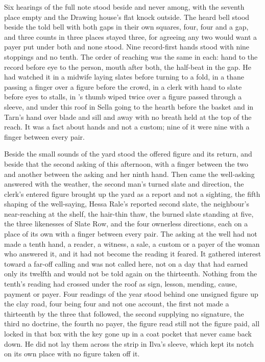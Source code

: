 Six hearings of the full note stood beside and never among, with the seventh place empty and the Drawing house's flat knock outside. The heard bell stood beside the told bell with both gaps in their own squares, four, four and a gap, and three counts in three places stayed three, for agreeing any two would want a payer put under both and none stood. Nine record-first hands stood with nine stoppings and no tenth. The order of reaching was the same in each: hand to the record before eye to the person, mouth after both, the half-beat in the gap. He had watched it in a midwife laying slates before turning to a fold, in a thane passing a finger over a figure before the crowd, in a clerk with hand to slate before eyes to stalls, in 's thumb wiped twice over a figure passed through a sleeve, and under this roof in Sella going to the hearth before the basket and in Tarn's hand over blade and sill and away with no breath held at the top of the reach. It was a fact about hands and not a custom; nine of it were nine with a finger between every pair.

Beside the small sounds of the yard stood the offered figure and its return, and beside that the second asking of this afternoon, with a finger between the two and another between the asking and her ninth hand. Then came the well-asking answered with the weather, the second man's turned slate and direction, the clerk's entered figure brought up the yard as a report and not a sighting, the fifth shaping of the well-saying, Hessa Rale's reported second slate, the neighbour's near-reaching at the shelf, the hair-thin thaw, the burned slate standing at five, the three likenesses of Slate Row, and the four ownerless directions, each on a place of its own with a finger between every pair. The asking at the well had not made a tenth hand, a reader, a witness, a sale, a custom or a payer of the woman who answered it, and it had not become the reading it feared. It gathered interest toward a far-off calling and was not called here, not on a day that had earned only its twelfth and would not be told again on the thirteenth. Nothing from the tenth's reading had crossed under the roof as sign, lesson, mending, cause, payment or payer. Four readings of the year stood behind one unsigned figure up the clay road, four being four and not one account, the first not made a thirteenth by the three that followed, the second supplying no signature, the third no doctrine, the fourth no payer, the figure read still not the figure paid, all locked in that box with the key gone up in a coat pocket that never came back down. He did not lay them across the strip in Ilva's sleeve, which kept its notch on its own place with no figure taken off it.

